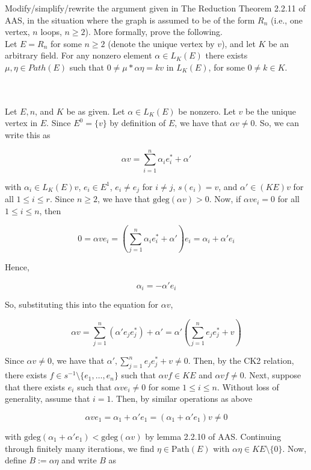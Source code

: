 Modify/simplify/rewrite the argument given in The Reduction Theorem 2.2.11 of AAS, in the situation
where the graph is assumed to be of the form $R_n$ (i.e., one vertex, $n$ loops, $n\geq2$). More
formally, prove the following.\\
Let $E=R_n$ for some $n\geq2$ (denote the unique vertex by $v$), and let $K$ be an arbitrary field. For
any nonzero element $\alpha\in L_K(E)$ there exists $\mu,\eta\in Path(E)$ such that
$0\neq\mu*\alpha\eta =kv$ in $L_K(E)$, for some $0\neq k\in K$.\\\\

\begin{solution}\renewcommand{\qedsymbol}{}\ \\
    Let $E, n$, and $K$ be as given. Let $\alpha\in L_K(E)$ be nonzero. Let $v$ be the unique vertex in
    $E$. Since $E^0=\{v\}$ by definition of $E$, we have that $\alpha v\neq0$. So, we can write this as
    
    $$\alpha v=\sum_{i=1}^n\alpha_ie_i^*+\alpha'$$

    with $\alpha_i\in L_K(E)v$, $e_i\in E^1$, $e_i\neq e_j$ for $i\neq j$, $s(e_i)=v$, and
    $\alpha'\in(KE)v$ for all $1\leq i\leq r$. Since $n\geq 2$, we have that $\text{gdeg}(\alpha v)>0$.
    Now, if $\alpha ve_i=0$ for all $1\leq i\leq n$, then
    
    $$0=\alpha ve_i=(\sum_{j=1}^n\alpha_ie_i^*+\alpha')e_i=\alpha_i+\alpha'e_i$$

    Hence,

    $$\alpha_i=-\alpha'e_i$$

    So, substituting this into the equation for $\alpha v$,

    $$\alpha v=\sum_{j=1}^n(\alpha'e_je_j^*)+\alpha'=\alpha'(\sum_{j=1}^ne_je_j^*+v)$$

    Since $\alpha v\neq 0$, we have that $\alpha',\sum_{j=1}^ne_je_j^*+v\neq0$. Then, by the CK2
    relation, there exists $f\in s^{-1}\setminus\{e_1,\ldots,e_n\}$ such that $\alpha vf\in KE$ and
    $\alpha vf\neq0$. Next, suppose that there exists $e_i$ such that $\alpha ve_i\neq 0$ for some
    $1\leq i\leq n$. Without loss of generality, assume that $i=1$. Then, by similar operations as above

    $$\alpha ve_1=\alpha_1+\alpha'e_1=(\alpha_1+\alpha'e_1)v\neq0$$

    with $\text{gdeg}(\alpha_1+\alpha'e_1)<\text{gdeg}(\alpha v)$ by lemma 2.2.10 of AAS. Continuing
    through finitely many iterations, we find $\eta\in\text{Path}(E)$ with
    $\alpha\eta\in KE\setminus\{0\}$. Now, define $B:=\alpha\eta$ and write $B$ as


\end{solution}
